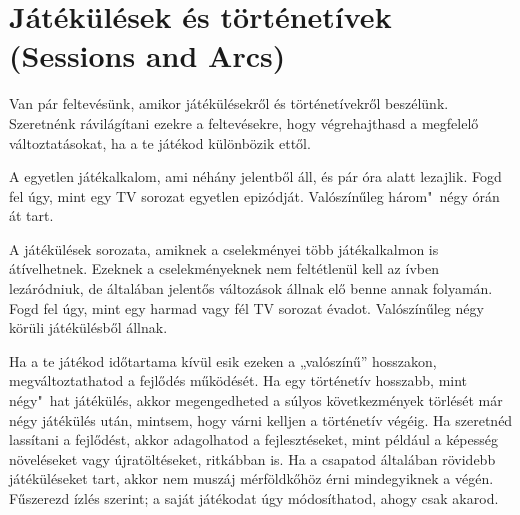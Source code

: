 \label{Játékülések és történetívek}
\section[Játékülések és történetívek]{Játékülések és történetívek (Sessions and Arcs)}

Van pár feltevésünk, amikor játékülésekről és történetívekről beszélünk. Szeretnénk rávilágítani ezekre a feltevésekre, hogy végrehajthasd a megfelelő változtatásokat, ha a te játékod különbözik ettől.

A  egyetlen játékalkalom, ami néhány jelentből áll, és pár óra alatt lezajlik. Fogd fel úgy, mint egy TV sorozat egyetlen epizódját. Valószínűleg három"~négy órán át tart.

A  játékülések sorozata, amiknek a cselekményei több játékalkalmon is átívelhetnek. Ezeknek a cselekményeknek nem feltétlenül kell az ívben lezáródniuk, de általában jelentős változások állnak elő benne annak folyamán. Fogd fel úgy, mint egy harmad vagy fél TV sorozat évadot. Valószínűleg négy körüli játékülésből állnak.

Ha a te játékod időtartama kívül esik ezeken a „valószínű” hosszakon, megváltoztathatod a fejlődés működését.  Ha egy történetív hosszabb, mint négy"~hat játékülés, akkor megengedheted a súlyos következmények törlését már négy játékülés után, mintsem, hogy várni kelljen a történetív végéig. Ha szeretnéd lassítani a fejlődést, akkor adagolhatod a fejlesztéseket, mint például a képesség növeléseket vagy újratöltéseket, ritkábban is. Ha a csapatod általában rövidebb játéküléseket tart, akkor nem muszáj mérföldkőhöz érni mindegyiknek a végén. Fűszerezd ízlés szerint; a saját játékodat úgy módosíthatod, ahogy csak akarod.
